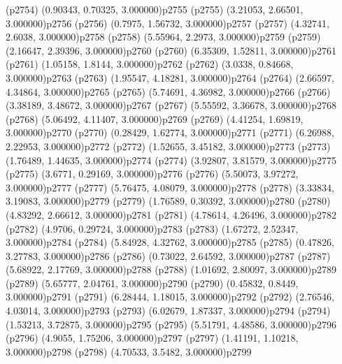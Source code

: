 \psdot(p2754)
\psPoint(0.90343, 0.70325, 3.000000){p2755}
\psdot(p2755)
\psPoint(3.21053, 2.66501, 3.000000){p2756}
\psdot(p2756)
\psPoint(0.7975, 1.56732, 3.000000){p2757}
\psdot(p2757)
\psPoint(4.32741, 2.6038, 3.000000){p2758}
\psdot(p2758)
\psPoint(5.55964, 2.2973, 3.000000){p2759}
\psdot(p2759)
\psPoint(2.16647, 2.39396, 3.000000){p2760}
\psdot(p2760)
\psPoint(6.35309, 1.52811, 3.000000){p2761}
\psdot(p2761)
\psPoint(1.05158, 1.8144, 3.000000){p2762}
\psdot(p2762)
\psPoint(3.0338, 0.84668, 3.000000){p2763}
\psdot(p2763)
\psPoint(1.95547, 4.18281, 3.000000){p2764}
\psdot(p2764)
\psPoint(2.66597, 4.34864, 3.000000){p2765}
\psdot(p2765)
\psPoint(5.74691, 4.36982, 3.000000){p2766}
\psdot(p2766)
\psPoint(3.38189, 3.48672, 3.000000){p2767}
\psdot(p2767)
\psPoint(5.55592, 3.36678, 3.000000){p2768}
\psdot(p2768)
\psPoint(5.06492, 4.11407, 3.000000){p2769}
\psdot(p2769)
\psPoint(4.41254, 1.69819, 3.000000){p2770}
\psdot(p2770)
\psPoint(0.28429, 1.62774, 3.000000){p2771}
\psdot(p2771)
\psPoint(6.26988, 2.22953, 3.000000){p2772}
\psdot(p2772)
\psPoint(1.52655, 3.45182, 3.000000){p2773}
\psdot(p2773)
\psPoint(1.76489, 1.44635, 3.000000){p2774}
\psdot(p2774)
\psPoint(3.92807, 3.81579, 3.000000){p2775}
\psdot(p2775)
\psPoint(3.6771, 0.29169, 3.000000){p2776}
\psdot(p2776)
\psPoint(5.50073, 3.97272, 3.000000){p2777}
\psdot(p2777)
\psPoint(5.76475, 4.08079, 3.000000){p2778}
\psdot(p2778)
\psPoint(3.33834, 3.19083, 3.000000){p2779}
\psdot(p2779)
\psPoint(1.76589, 0.30392, 3.000000){p2780}
\psdot(p2780)
\psPoint(4.83292, 2.66612, 3.000000){p2781}
\psdot(p2781)
\psPoint(4.78614, 4.26496, 3.000000){p2782}
\psdot(p2782)
\psPoint(4.9706, 0.29724, 3.000000){p2783}
\psdot(p2783)
\psPoint(1.67272, 2.52347, 3.000000){p2784}
\psdot(p2784)
\psPoint(5.84928, 4.32762, 3.000000){p2785}
\psdot(p2785)
\psPoint(0.47826, 3.27783, 3.000000){p2786}
\psdot(p2786)
\psPoint(0.73022, 2.64592, 3.000000){p2787}
\psdot(p2787)
\psPoint(5.68922, 2.17769, 3.000000){p2788}
\psdot(p2788)
\psPoint(1.01692, 2.80097, 3.000000){p2789}
\psdot(p2789)
\psPoint(5.65777, 2.04761, 3.000000){p2790}
\psdot(p2790)
\psPoint(0.45832, 0.8449, 3.000000){p2791}
\psdot(p2791)
\psPoint(6.28444, 1.18015, 3.000000){p2792}
\psdot(p2792)
\psPoint(2.76546, 4.03014, 3.000000){p2793}
\psdot(p2793)
\psPoint(6.02679, 1.87337, 3.000000){p2794}
\psdot(p2794)
\psPoint(1.53213, 3.72875, 3.000000){p2795}
\psdot(p2795)
\psPoint(5.51791, 4.48586, 3.000000){p2796}
\psdot(p2796)
\psPoint(4.9055, 1.75206, 3.000000){p2797}
\psdot(p2797)
\psPoint(1.41191, 1.10218, 3.000000){p2798}
\psdot(p2798)
\psPoint(4.70533, 3.5482, 3.000000){p2799}
